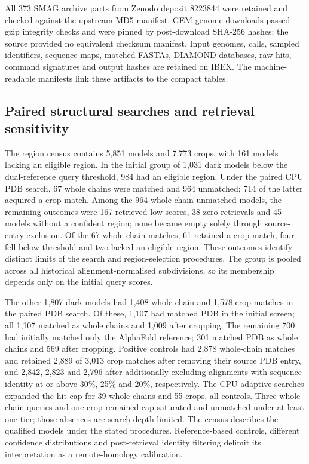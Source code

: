 \documentclass[11pt]{article}
\begin{document}
All 373 SMAG archive parts from Zenodo deposit 8223844 were retained and checked against the
upstream MD5 manifest. GEM genome downloads passed gzip integrity checks and were pinned by
post-download SHA-256 hashes; the source provided no equivalent checksum manifest.
Input genomes, calls, sampled identifiers, sequence maps, matched FASTAs, DIAMOND databases,
raw hits, command signatures and output hashes are retained on IBEX. The machine-readable
manifests link these artifacts to the compact tables.


\subsection*{Paired structural searches and retrieval sensitivity}
The region census contains 5{,}851 models and 7{,}773 crops, with 161 models lacking an eligible
region. In the initial group of 1{,}031 dark models below the dual-reference query threshold,
984 had an eligible region. Under the paired CPU PDB search, 67 whole chains were matched and
964 unmatched; 714 of the latter acquired a crop match. Among the 964 whole-chain-unmatched models, the remaining outcomes were 167 retrieved low
scores, 38 zero retrievals and 45 models without a confident region; none became empty solely
through source-entry exclusion. Of the 67 whole-chain matches, 61 retained a crop match, four
fell below threshold and two lacked an eligible region. These outcomes identify distinct
limits of the search and region-selection procedures. The group is pooled across all historical
alignment-normalised subdivisions, so its membership depends only on the initial query scores.

The other 1{,}807 dark models had 1{,}408 whole-chain and 1{,}578 crop matches in the paired
PDB search. Of these, 1{,}107 had matched PDB in the initial screen; all 1{,}107 matched as
whole chains and 1{,}009 after cropping. The remaining 700 had initially matched only the
AlphaFold reference; 301 matched PDB as whole chains and 569 after cropping.
Positive controls had 2{,}878 whole-chain matches and retained 2{,}889 of 3{,}013 crop matches after removing their source PDB entry,
and 2{,}842, 2{,}823 and 2{,}796 after additionally excluding alignments with sequence identity
at or above 30\%, 25\% and 20\%, respectively. The CPU adaptive searches expanded the hit cap
for 39 whole chains and 55 crops, all controls. Three whole-chain queries and one crop remained
cap-saturated and unmatched under at least one tier; those absences are search-depth limited.
The census describes the qualified models under the stated procedures. Reference-based
controls, different confidence distributions and post-retrieval identity filtering delimit
its interpretation as a remote-homology calibration.
\end{document}
